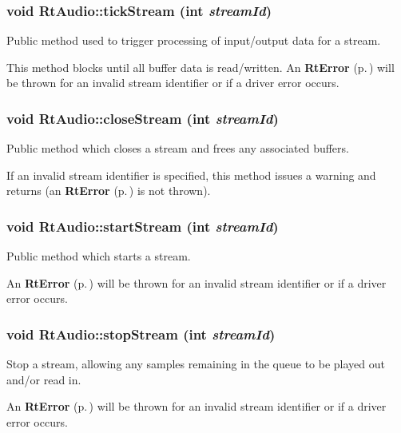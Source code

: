 \subsubsection{\setlength{\rightskip}{0pt plus 5cm}void Rt\-Audio::tick\-Stream (int {\em stream\-Id})}\label{classRtAudio_a9}


Public method used to trigger processing of input/output data for a stream.

This method blocks until all buffer data is read/written. An {\bf Rt\-Error} {\rm (p.\,\pageref{classRtError})} will be thrown for an invalid stream identifier or if a driver error occurs. 
\subsubsection{\setlength{\rightskip}{0pt plus 5cm}void Rt\-Audio::close\-Stream (int {\em stream\-Id})}\label{classRtAudio_a10}


Public method which closes a stream and frees any associated buffers.

If an invalid stream identifier is specified, this method issues a warning and returns (an {\bf Rt\-Error} {\rm (p.\,\pageref{classRtError})} is not thrown). 
\subsubsection{\setlength{\rightskip}{0pt plus 5cm}void Rt\-Audio::start\-Stream (int {\em stream\-Id})}\label{classRtAudio_a11}


Public method which starts a stream.

An {\bf Rt\-Error} {\rm (p.\,\pageref{classRtError})} will be thrown for an invalid stream identifier or if a driver error occurs. 
\subsubsection{\setlength{\rightskip}{0pt plus 5cm}void Rt\-Audio::stop\-Stream (int {\em stream\-Id})}\label{classRtAudio_a12}


Stop a stream, allowing any samples remaining in the queue to be played out and/or read in.

An {\bf Rt\-Error} {\rm (p.\,\pageref{classRtError})} will be thrown for an invalid stream identifier or if a driver error occurs. 
